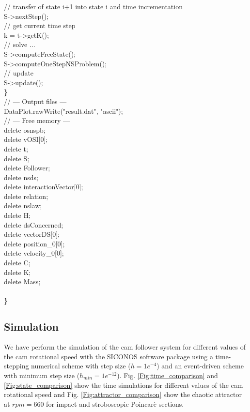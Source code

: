 \begin{tabbing}
 \> // transfer of state i+1 into state i and time
 incrementation\\
 \> S->nextStep();\\

 \> // get current time step\\
 \> k = t->getK();\\
 \> // solve ...\\
 \> S->computeFreeState();\\
 \> S->computeOneStepNSProblem();\\
 \> // update\\
 \> S->update();
 \-\\
 \>   {\bf \} }\\
\>    // --- Output files ---\\
 \> DataPlot.rawWrite("result.dat", "ascii");\\

 \> // --- Free memory ---\\
 \> delete osnspb;\\
 \> delete vOSI[0];\\
 \> delete t;\\
 \> delete S;\\
 \> delete Follower;\\
 \> delete nsds;\\
 \> delete interactionVector[0];\\
 \> delete relation;\\
 \> delete nslaw;\\
 \> delete H;\\
 \> delete dsConcerned;\\
 \> delete vectorDS[0];\\
 \> delete position\_0[0];\\
 \> delete velocity\_0[0];\\
 \> delete C;\\
 \> delete K;\\
 \> delete Mass;\\

    \-\\
 \>  {\bf\}}
\end{tabbing}
\newpage
\subsection{Simulation}
We have perform the simulation of the cam follower system for
different values of the cam rotational speed with the SICONOS
software package using a time-stepping numerical scheme with step
size ($h=1e^{-4}$) and an event-driven scheme with minimum step
size \linebreak ($h_{min}=1e^{-12}$). Fig.
\ref{Fig:time_comparison} and \ref{Fig:state_comparison} show the
time simulations for different values of the cam rotational speed
and Fig. \ref{Fig:attractor_comparison} show the chaotic attractor
at $rpm=660$ for impact and stroboscopic Poincar\`e sections.

